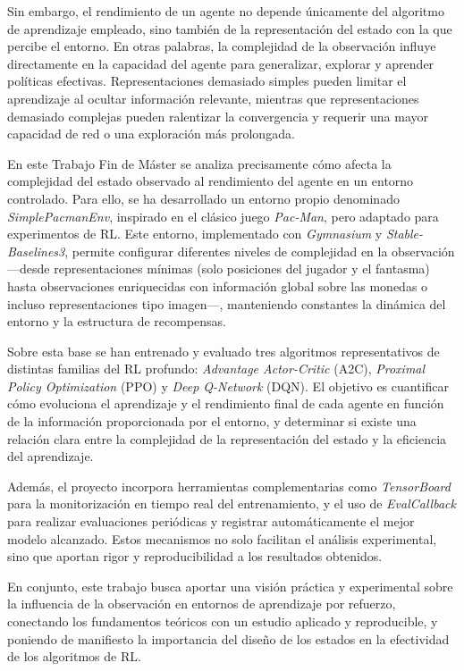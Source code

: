 \documentclass[12pt,a4paper,twoside,openany]{book}
\begin{document}
Sin embargo, el rendimiento de un agente no depende únicamente del algoritmo de aprendizaje empleado, sino también de la representación del estado con la que percibe el entorno. En otras palabras, la complejidad de la observación influye directamente en la capacidad del agente para generalizar, explorar y aprender políticas efectivas. Representaciones demasiado simples pueden limitar el aprendizaje al ocultar información relevante, mientras que representaciones demasiado complejas pueden ralentizar la convergencia y requerir una mayor capacidad de red o una exploración más prolongada.

En este Trabajo Fin de Máster se analiza precisamente cómo afecta la complejidad del estado observado al rendimiento del agente en un entorno controlado. Para ello, se ha desarrollado un entorno propio denominado \textit{SimplePacmanEnv}, inspirado en el clásico juego \textit{Pac-Man}, pero adaptado para experimentos de RL. Este entorno, implementado con \textit{Gymnasium} y \textit{Stable-Baselines3}, permite configurar diferentes niveles de complejidad en la observación —desde representaciones mínimas (solo posiciones del jugador y el fantasma) hasta observaciones enriquecidas con información global sobre las monedas o incluso representaciones tipo imagen—, manteniendo constantes la dinámica del entorno y la estructura de recompensas.

Sobre esta base se han entrenado y evaluado tres algoritmos representativos de distintas familias del RL profundo: \textit{Advantage Actor-Critic} (A2C), \textit{Proximal Policy Optimization} (PPO) y \textit{Deep Q-Network} (DQN). El objetivo es cuantificar cómo evoluciona el aprendizaje y el rendimiento final de cada agente en función de la información proporcionada por el entorno, y determinar si existe una relación clara entre la complejidad de la representación del estado y la eficiencia del aprendizaje.

Además, el proyecto incorpora herramientas complementarias como \textit{TensorBoard} para la monitorización en tiempo real del entrenamiento, y el uso de \textit{EvalCallback} para realizar evaluaciones periódicas y registrar automáticamente el mejor modelo alcanzado. Estos mecanismos no solo facilitan el análisis experimental, sino que aportan rigor y reproducibilidad a los resultados obtenidos.

En conjunto, este trabajo busca aportar una visión práctica y experimental sobre la influencia de la observación en entornos de aprendizaje por refuerzo, conectando los fundamentos teóricos con un estudio aplicado y reproducible, y poniendo de manifiesto la importancia del diseño de los estados en la efectividad de los algoritmos de RL.
\end{document}
